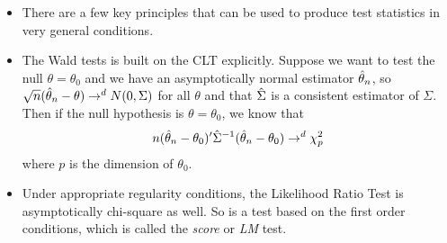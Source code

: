 \begin{itemize}[leftmargin=0pt]

\item There are a few key principles that can be used to produce test
  statistics in very general conditions.

\item The Wald tests is built on the CLT explicitly.  Suppose we want
  to test the null $\theta = \theta_0$ and we have an asymptotically normal
  estimator $\hat{\theta}_n$, so $\sqrt{n} (\hat{\theta}_n - \theta) \to^d N(0,\Sigma)$ for all $\theta$
  and that $\hat{\Sigma}$ is a consistent estimator of $\Sigma$.  Then if the null
  hypothesis is $\theta = \theta_0$, we know that
  \begin{equation*}
    n (\hat{\theta}_n - \theta_0)' \hat{\Sigma}^{-1} (\hat{\theta}_n - \theta_0) \to^d \chi^2_p
  \end{equation*}
  where $p$ is the dimension of $\theta_0$.

\item Under appropriate regularity conditions, the Likelihood Ratio
  Test is asymptotically chi-square as well.  So is a test based on
  the first order conditions, which is called the \emph{score} or
  \emph{LM} test.

\end{itemize}

